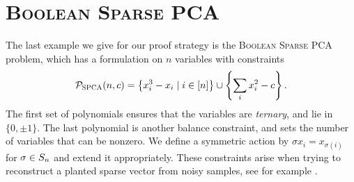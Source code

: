 \section{\textsc{Boolean Sparse PCA}}
The last example we give for our proof strategy is the \textsc{Boolean Sparse PCA} problem, which has a formulation on $n$ variables with constraints
\begin{align*}
\mathcal P_{\textsc{SPCA}}(n,c) = \left\{x_i^3 - x_i \mid i \in [n]\right\} \cup \left\{\sum_i x_i^2 - c\right\}.\label{eq:bspca-formulation}
\end{align*}
The first set of polynomials ensures that the variables are \emph{ternary}, and lie in $\{0,\pm 1\}$. The last polynomial is another balance constraint, and sets the number of variables that can be nonzero. We define a symmetric action by $\sigma x_i = x_{\sigma(i)}$ for $\sigma \in S_{n}$ and extend it appropriately. These constraints arise when trying to reconstruct a planted sparse vector from noisy samples, see for example \cite{MW15}.


